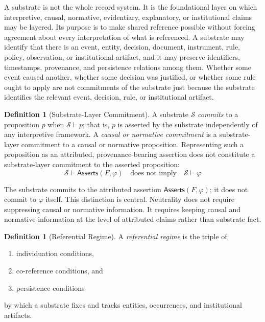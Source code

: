 \documentclass[11pt]{article}
\theoremstyle{plain}
\theoremstyle{definition}
\newtheorem{definition}[theorem]{Definition}
\theoremstyle{remark}
\newcommand{\Substrate}{\mathcal{S}}
\newcommand{\Framework}{F}
\newcommand{\entails}{\vdash}
\newcommand{\Asserts}{\mathsf{Asserts}}
\begin{document}
A substrate is not the whole record system.
It is the foundational layer on which
interpretive, causal, normative, evidentiary, explanatory, or
institutional claims may be layered.
Its purpose is to make shared reference
possible without forcing agreement about every interpretation of what is
referenced.
A substrate may identify that there is an event, entity, decision,
document, instrument, rule, policy, observation, or institutional artifact, and
it may preserve identifiers, timestamps, provenance, and persistence relations
among them.
Whether some event caused another,
whether some decision was justified, or
whether some rule ought to apply
are not commitments of the substrate
just because the substrate identifies
the relevant event, decision, rule,
or institutional artifact.

\begin{definition}[Substrate-Layer Commitment]
  \label{se100.def.SubstrateCommitment}
  A substrate $\Substrate$ \emph{commits} to a proposition $p$ when
  $\Substrate \entails p$; that is, $p$ is asserted by the substrate
  independently of any interpretive framework.
  A \emph{causal or normative commitment} is a substrate-layer commitment
  to a causal or normative proposition.
  Representing such a proposition as an attributed,
  provenance-bearing assertion does not
  constitute a substrate-layer commitment
  to the asserted proposition:
  \[
    \Substrate \entails \Asserts(\Framework,\varphi)
    \quad\text{does not imply}\quad
    \Substrate \entails \varphi
  \]
\end{definition}

The substrate commits to the attributed assertion
$\Asserts(\Framework,\varphi)$;
it does not commit to $\varphi$ itself.
This distinction is central.
Neutrality does not require suppressing causal or normative information.
It requires keeping causal and normative information at the level
of attributed claims rather than substrate fact.

\begin{definition}[Referential Regime]
  \label{se100.def.ReferentialRegime}
  A \emph{referential regime} is the triple of
  \begin{enumerate}
    \item individuation conditions,
    \item co-reference conditions, and
    \item persistence conditions
  \end{enumerate}
  by which a substrate fixes and tracks entities, occurrences, and institutional
  artifacts.
\end{definition}
\end{document}
